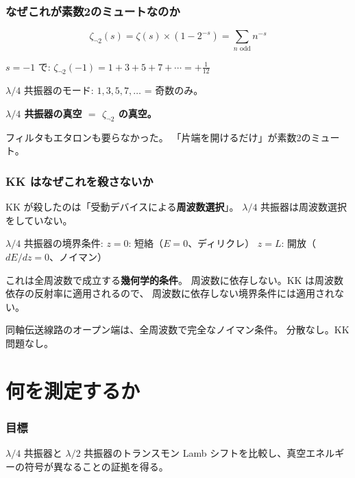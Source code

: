 \documentclass[12pt,a4paper]{article}
\begin{document}
\section{なぜこれが素数2のミュートなのか}

\begin{mathbox}[オイラー積との対応]
$$\zeta_{\neg 2}(s) = \zeta(s) \times (1-2^{-s}) = \sum_{n \text{ odd}} n^{-s}$$

$s = -1$ で:
$\zeta_{\neg 2}(-1) = 1 + 3 + 5 + 7 + \cdots = +\frac{1}{12}$

$\lambda/4$ 共振器のモード: $1, 3, 5, 7, \ldots$ = 奇数のみ。

\textbf{$\lambda/4$ 共振器の真空 $=$ $\zeta_{\neg 2}$ の真空。}

フィルタもエタロンも要らなかった。
「片端を開けるだけ」が素数2のミュート。
\end{mathbox}

\section{KK はなぜこれを殺さないか}

\begin{honestbox}
KK が殺したのは「受動デバイスによる\textbf{周波数選択}」。
$\lambda/4$ 共振器は周波数選択をしていない。

$\lambda/4$ 共振器の境界条件:
$z = 0$: 短絡（$E = 0$、ディリクレ）
$z = L$: 開放（$dE/dz = 0$、ノイマン）

これは全周波数で成立する\textbf{幾何学的条件}。
周波数に依存しない。KK は周波数依存の反射率に適用されるので、
周波数に依存しない境界条件には適用されない。

同軸伝送線路のオープン端は、全周波数で完全なノイマン条件。
分散なし。KK 問題なし。
\end{honestbox}

\part{何を測定するか}

\section{目標}

$\lambda/4$ 共振器と $\lambda/2$ 共振器のトランスモン Lamb シフトを比較し、真空エネルギーの符号が異なることの証拠を得る。
\end{document}

